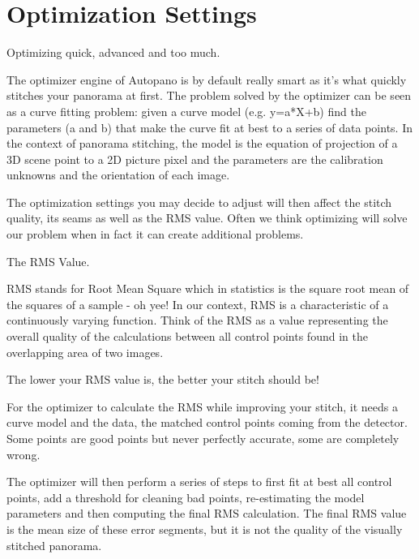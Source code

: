 \chapter{Optimization Settings}
\pagecolor{white}
\label{chap:35}
\begin{fullwidth}

\problem

{\large Optimizing quick, advanced and too much. \par}

The optimizer engine of Autopano is by default really smart as it’s what quickly stitches your panorama at first. The problem solved by the optimizer can be seen as a curve fitting problem: given a curve model (e.g. y=a*X+b) find the parameters (a and b) that make the curve fit at best to a series of data points. In the context of panorama stitching, the model is the equation of projection of a 3D scene point to a 2D picture pixel and the parameters are the calibration unknowns and the orientation of each image.

The optimization settings you may decide to adjust will then affect the stitch quality, its seams as well as the RMS value. Often we think optimizing will solve our problem when in fact it can create additional problems.

\solution

{\large The RMS Value. \par}

RMS stands for Root Mean Square which in statistics is the square root mean of the squares of a sample - oh yee! In our context, RMS is a characteristic of a continuously varying function. Think of the RMS as a value representing the overall quality of the calculations between all control points found in the overlapping area of two images.

The lower your RMS value is, the better your stitch should be!


For the optimizer to calculate the RMS while improving your stitch, it needs a curve model and the data, the matched control points coming from the detector. Some points are good points but never perfectly accurate, some are completely wrong. 

The optimizer will then perform a series of steps to first fit at best all control points, add a threshold for cleaning bad points, re-estimating the model parameters and then computing the final RMS calculation. The final RMS value is the mean size of these error segments, but it is not the quality of the visually stitched panorama.


\end{fullwidth}
